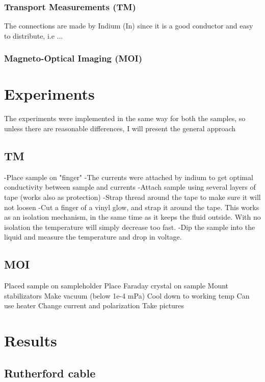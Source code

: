 \documentclass{comjnl}
\begin{document}
\subsubsection{Transport Measurements (TM)}
The connections are made by Indium (In) since it is a good conductor and easy to distribute, i.e ...

\subsubsection{Magneto-Optical Imaging (MOI)}


\section{Experiments} \label{Sec:Experiments}
The experiments were implemented in the same way for both the samples, so unless there are reasonable differences, I will present the general approach

\subsection{TM}
-Place sample on "finger"
-The currents were attached by indium to get optimal conductivity between sample and currents
-Attach sample using several layers of tape (works also as protection)
-Strap thread around the tape to make sure it will not loosen
-Cut a finger of a vinyl glow, and strap it around the tape. This works as an isolation mechanism, in the same time as it keeps the fluid outside. With no isolation the temperature will simply decrease too fast.
-Dip the sample into the liquid and measure the temperature and drop in voltage.

\subsection{MOI}
Placed sample on sampleholder
Place Faraday crystal on sample
Mount stabilizators
Make vacuum (below 1e-4 mPa)
Cool down to working temp
Can use heater 
Change current and polarization
Take pictures


\section{Results}  \label{Sec:Results}
\subsection{Rutherford cable}
\end{document}
